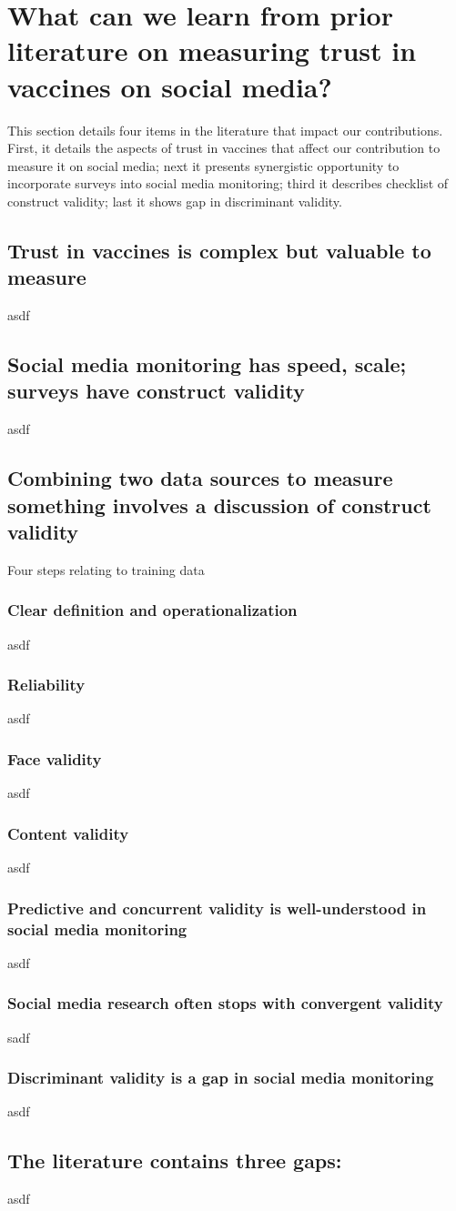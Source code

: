 \chapter{What can we learn from prior literature on measuring trust in vaccines on social media?}\label{chap:litreview}
This section details four items in the literature that impact our contributions. First, it details the aspects of trust in vaccines that affect our contribution to measure it on social media; next it presents synergistic opportunity to incorporate surveys into social media monitoring; third it describes checklist of construct validity; last it shows gap in discriminant validity.
\section{Trust in vaccines is complex but valuable to measure}
asdf
\section{Social media monitoring has speed, scale; surveys have construct validity}
asdf
\section{Combining two data sources to measure something involves a discussion of construct validity}

Four steps relating to training data
\subsection{Clear definition and operationalization}
asdf
\subsection{Reliability}
asdf
\subsection{Face validity}
asdf
\subsection{Content validity}
asdf
\subsection{Predictive and concurrent validity is well-understood in social media monitoring}
asdf
\subsection{Social media research often stops with convergent validity}
sadf
\subsection{Discriminant validity is a gap in social media monitoring}
asdf
\section{The literature contains three gaps:}
asdf